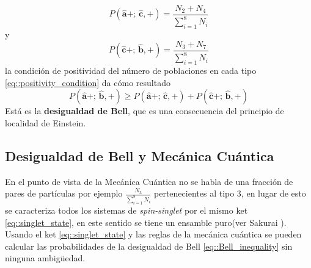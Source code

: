 \documentclass[a4paper]{article}
\begin{document}
\begin{equation}
P(\mathbf{\hat{a}}+;\, \mathbf{\hat{c}},+) = \frac{N_2+N_4}{\sum_{i=1}^{8} N_i} 
\end{equation}
y
\begin{equation}
P(\mathbf{\hat{c}}+;\, \mathbf{\hat{b}},+) = \frac{N_3+N_7}{\sum_{i=1}^{8} N_i} 
\end{equation}
la condición de positividad del número de poblaciones en cada tipo \ref{eq::positivity_condition} da cómo resultado
\begin{equation}\label{eq::Bell_inequality}
P(\mathbf{\hat{a}}+;\, \mathbf{\hat{b}},+) \geq P(\mathbf{\hat{a}}+;\, \mathbf{\hat{c}},+) + P(\mathbf{\hat{c}}+;\, \mathbf{\hat{b}},+)  
\end{equation}
Está es la \textbf{desigualdad de Bell}, que es una consecuencia del principio de localidad de Einstein.

\subsection{Desigualdad de Bell y Mecánica Cuántica}
En el punto de vista de la Mecánica Cuántica no se habla de una fracción de pares de partículas por ejemplo $\frac{N_3}{\sum_{i=1}^{8} N_i}$ pertenecientes al tipo 3, en lugar de esto se caracteriza todos los sistemas de \textit{spin-singlet} por el mismo ket \ref{eq::singlet_state}, en este sentido se tiene un ensamble puro(ver Sakurai \cite{Sakurai}). Usando el ket \ref{eq::singlet_state} y las reglas de la mecánica cuántica se pueden calcular las probabilidades de la desigualdad de Bell \ref{eq::Bell_inequality} sin ninguna ambigüedad.\\
\end{document}

